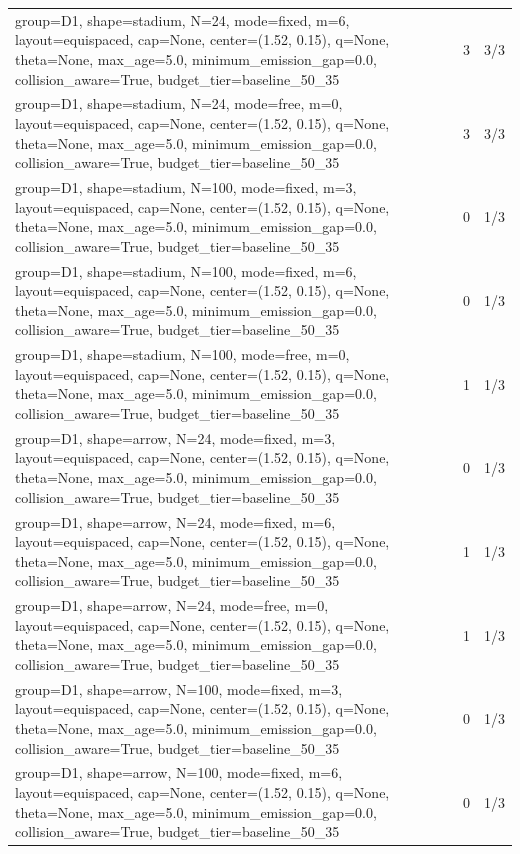 \begin{tabular}{p{11cm}rr}
group=D1, shape=stadium, N=24, mode=fixed, m=6, layout=equispaced, cap=None, center=(1.52, 0.15), q=None, theta=None, max\_age=5.0, minimum\_emission\_gap=0.0, collision\_aware=True, budget\_tier=baseline\_50\_35 & 3 & 3/3 \\
group=D1, shape=stadium, N=24, mode=free, m=0, layout=equispaced, cap=None, center=(1.52, 0.15), q=None, theta=None, max\_age=5.0, minimum\_emission\_gap=0.0, collision\_aware=True, budget\_tier=baseline\_50\_35 & 3 & 3/3 \\
group=D1, shape=stadium, N=100, mode=fixed, m=3, layout=equispaced, cap=None, center=(1.52, 0.15), q=None, theta=None, max\_age=5.0, minimum\_emission\_gap=0.0, collision\_aware=True, budget\_tier=baseline\_50\_35 & 0 & 1/3 \\
group=D1, shape=stadium, N=100, mode=fixed, m=6, layout=equispaced, cap=None, center=(1.52, 0.15), q=None, theta=None, max\_age=5.0, minimum\_emission\_gap=0.0, collision\_aware=True, budget\_tier=baseline\_50\_35 & 0 & 1/3 \\
group=D1, shape=stadium, N=100, mode=free, m=0, layout=equispaced, cap=None, center=(1.52, 0.15), q=None, theta=None, max\_age=5.0, minimum\_emission\_gap=0.0, collision\_aware=True, budget\_tier=baseline\_50\_35 & 1 & 1/3 \\
group=D1, shape=arrow, N=24, mode=fixed, m=3, layout=equispaced, cap=None, center=(1.52, 0.15), q=None, theta=None, max\_age=5.0, minimum\_emission\_gap=0.0, collision\_aware=True, budget\_tier=baseline\_50\_35 & 0 & 1/3 \\
group=D1, shape=arrow, N=24, mode=fixed, m=6, layout=equispaced, cap=None, center=(1.52, 0.15), q=None, theta=None, max\_age=5.0, minimum\_emission\_gap=0.0, collision\_aware=True, budget\_tier=baseline\_50\_35 & 1 & 1/3 \\
group=D1, shape=arrow, N=24, mode=free, m=0, layout=equispaced, cap=None, center=(1.52, 0.15), q=None, theta=None, max\_age=5.0, minimum\_emission\_gap=0.0, collision\_aware=True, budget\_tier=baseline\_50\_35 & 1 & 1/3 \\
group=D1, shape=arrow, N=100, mode=fixed, m=3, layout=equispaced, cap=None, center=(1.52, 0.15), q=None, theta=None, max\_age=5.0, minimum\_emission\_gap=0.0, collision\_aware=True, budget\_tier=baseline\_50\_35 & 0 & 1/3 \\
group=D1, shape=arrow, N=100, mode=fixed, m=6, layout=equispaced, cap=None, center=(1.52, 0.15), q=None, theta=None, max\_age=5.0, minimum\_emission\_gap=0.0, collision\_aware=True, budget\_tier=baseline\_50\_35 & 0 & 1/3 \\

\end{tabular}
